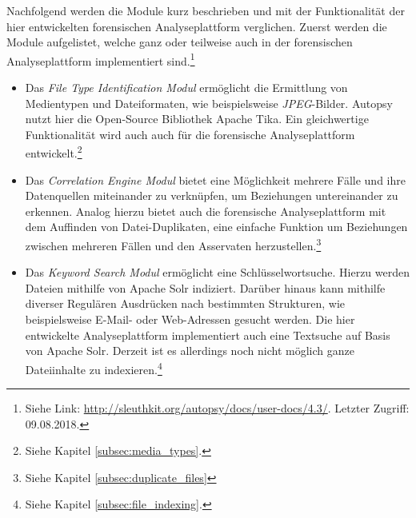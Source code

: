\noindent
Nachfolgend werden die Module kurz beschrieben und mit der Funktionalität der hier entwickelten forensischen Analyseplattform verglichen. Zuerst werden die Module aufgelistet, welche ganz oder teilweise auch in der forensischen Analyseplattform implementiert sind.\footnote{Siehe Link: \url{http://sleuthkit.org/autopsy/docs/user-docs/4.3/}. Letzter Zugriff: 09.08.2018.}

\begin{itemize}
\item Das \textit{File Type Identification Modul} ermöglicht die Ermittlung von Medientypen und Dateiformaten, wie beispielsweise \textit{JPEG}-Bilder. Autopsy nutzt hier die Open-Source Bibliothek Apache Tika\texttrademark. Ein gleichwertige Funktionalität wird auch auch für die forensische Analyseplattform entwickelt.\footnote{Siehe Kapitel \ref{subsec:media_types}.}
\item Das \textit{Correlation Engine Modul} bietet eine Möglichkeit mehrere Fälle und ihre Datenquellen miteinander zu verknüpfen, um Beziehungen untereinander zu erkennen. Analog hierzu bietet auch die forensische Analyseplattform mit dem Auffinden von Datei-Duplikaten, eine einfache Funktion um Beziehungen zwischen mehreren Fällen und den Asservaten herzustellen.\footnote{Siehe Kapitel \ref{subsec:duplicate_files}}
\item Das \textit{Keyword Search Modul} ermöglicht eine Schlüsselwortsuche. Hierzu werden Dateien mithilfe von Apache Solr indiziert. Darüber hinaus kann mithilfe diverser Regulären Ausdrücken nach bestimmten Strukturen, wie beispielsweise E-Mail- oder Web-Adressen gesucht werden. Die hier entwickelte Analyseplattform implementiert auch eine Textsuche auf Basis von Apache Solr. Derzeit ist es allerdings noch nicht möglich ganze Dateiinhalte zu indexieren.\footnote{Siehe Kapitel \ref{subsec:file_indexing}.}
\end{itemize}

